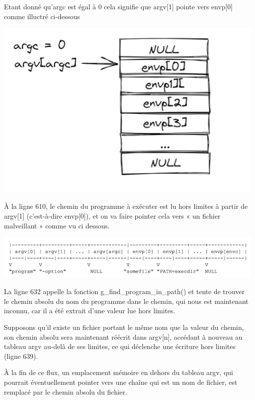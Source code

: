 \documentclass[12pt,a4paper]{article}
\begin{document}
\begin{flushleft}
                \item  Etant donné qu'argc est égal à 0 cela signifie que argv[1] pointe vers envp[0] comme illuctré ci-dessous
                \begin{center}
                    \includegraphics[scale=0.7]{ecriture}
                \end{center}
                \item À la ligne 610, le chemin du programme à exécuter est lu hors limites à partir de argv[1] (c’est-à-dire envp[0]), et on va faire pointer cela  vers « un fichier malveillant » comme vu ci dessous.
                \begin{center}
                    \includegraphics[scale=0.4]{image}                
                \end{center}
                \item La ligne 632 appelle la fonction g\_find\_program\_in\_path() et tente de trouver le chemin absolu du nom du programme dans le chemin, qui nous est maintenant inconnu, car il a été extrait d’une valeur lue hors limites. 
                \item Supposons qu’il existe un fichier portant le même nom que la valeur du chemin, son chemin absolu sera maintenant réécrit dans argv[n], accédant à nouveau au tableau argv au-delà de ses limites, ce qui déclenche une écriture hors limites (ligne 639).
                \item À la fin de ce flux, un emplacement mémoire en dehors du tableau argv, qui pourrait éventuellement pointer vers une chaîne qui est un nom de fichier, est remplacé par le chemin absolu du fichier.

\end{flushleft}
\end{document}
